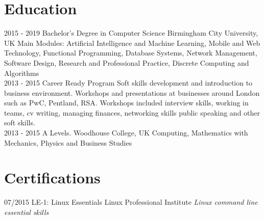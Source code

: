 \documentclass[]{friggeri-cv}
\begin{document}
\section{Education}
\begin{entrylist}
  \entry
    {2015 - 2019}
    {Bachelor's Degree in Computer Science}
    {Birmingham City University, UK}
    {Main Modules: Artificial Intelligence and Machine Learning, Mobile and Web Technology, Functional Programming, Database Systems, Network Management, Software Design, Research and Professional Practice, Discrete Computing and Algorithms\\}
  \entry
    {2013 - 2015}
    {Career Ready Program}
    {}
    {Soft skills development and introduction to business environment.
Workshops and presentations at businesses around London such as PwC, Pentland, RSA.
Workshops included interview skills, working in teams, cv writing, managing finances, networking skills public speaking and other soft skills.\\}
  \entry
    {2013 - 2015}
    {A Levels.}
    {Woodhouse College, UK}
    {Computing, Mathematics with Mechanics, Physics and Business Studies}
\end{entrylist}

\section{Certifications}
\begin{entrylist}
  \entry
    {07/2015}
    {LE-1: Linux Essentials}
    {Linux Professional Institute}
    {\emph{Linux command line essential skills}}
\end{entrylist}

\newpage
\end{document}

